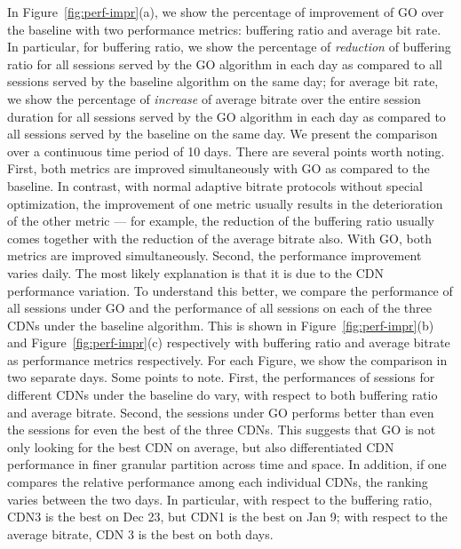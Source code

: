 In Figure~\ref{fig:perf-impr}(a), we show the percentage of improvement of GO over the baseline with two performance metrics: buffering ratio and average bit rate.  In particular, for buffering ratio, we show the percentage of {\em reduction} of buffering ratio for all sessions served by the GO algorithm in each day as compared to all sessions served by the baseline algorithm on the same day; for average bit rate, we show the percentage of {\em increase} of average bitrate over the entire session duration for all sessions served by the GO algorithm in each day as compared to all sessions served by the baseline on the same day.  We present the comparison over a continuous time period of 10 days. There are several points worth noting. First, both metrics are improved simultaneously with GO as compared to the baseline. In contrast, with normal adaptive bitrate protocols without special optimization, the improvement of one metric usually results in the deterioration of the other metric — for example, the reduction of the buffering ratio usually comes together with the reduction of the average bitrate also.   With GO, both metrics are 
improved simultaneously.  Second, the performance improvement varies daily.  The most likely explanation is that it is due to the CDN performance variation.  To understand this better, we compare the performance of all sessions under GO and the performance of all sessions on each of the three CDNs under the baseline algorithm. This is shown in Figure~\ref{fig:perf-impr}(b) and Figure~\ref{fig:perf-impr}(c) respectively with buffering ratio and average bitrate as performance metrics respectively.  For each Figure, we show the comparison in two separate days.  Some points to note. First, the performances of sessions for different CDNs under the baseline do vary, with respect to both buffering ratio and average bitrate. Second, the sessions under GO performs better than even the sessions for even the best of the three CDNs. This suggests that GO is not only looking for the best CDN on average, but also 
differentiated CDN performance in finer granular partition across time and space.  In addition, if one compares the relative performance among each individual CDNs, the ranking varies between the two days. In particular, with respect to the buffering ratio, CDN3 is the best on Dec 23, but CDN1 is the best on Jan 9; with respect to the average bitrate, CDN 3 is the best on both days.  
 

